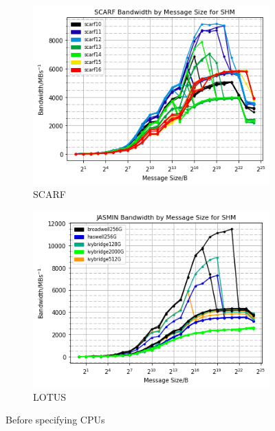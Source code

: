 \documentclass{article}
\begin{document}
            \begin{figure}[ht]
                \centering
                \begin{subfigure}{.5\textwidth}
                  \centering
                  \includegraphics[width=\textwidth]{scarf_bandwidth-msgsize_shm}
                  \caption{SCARF}
                \end{subfigure}%
                \begin{subfigure}{.5\textwidth}
                  \centering
                  \includegraphics[width=\textwidth]{jasmin_bandwidth-msgsize_shm}
                  \caption{LOTUS}
                \end{subfigure}
            \caption{Before specifying CPUs}
            \label{figure:imb-before-cpus}
            \end{figure}
\end{document}
